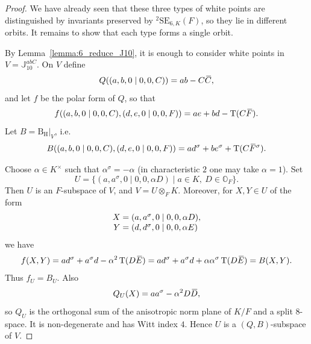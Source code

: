 \documentclass{amsart}
\def\ovC{\mathord{\mbox{\hspace*{0pt}}\,\overline{\!C\!\!\;}\!\:}\mbox{\hspace*{0pt}}}
\def\ovD{\mathord{\mbox{\hspace*{0pt}}\,\overline{\!D\!\!\;}\!\:}\mbox{\hspace*{0pt}}}
\def\ovE{\mathord{\mbox{\hspace*{0pt}}\,\overline{\!E\!\!\;}\!\:}\mbox{\hspace*{0pt}}}
\def\ovF{\mathord{\mbox{\hspace*{0pt}}\,\overline{\!F\!\!\;}\!\:}\mbox{\hspace*{0pt}}}
\def\OO{\mathord{\mathbb{O}}}
\newcommand{\SE}{\mathrm{SE}}
\newcommand{\Tr}{\operatorname{T}}
\newcommand{\J}{\mathbb{J}}
\newcommand{\B}{\mathrm{B}}
\renewcommand{\H}{\mathrm{H}}
\newcommand{\s}{\sigma}
\theoremstyle{plain}
\numberwithin{theorem}{section}
\theoremstyle{definition}
\begin{document}
\begin{proof}
	We have already seen that these three types of white points are distinguished by 
	invariants preserved by ${}^2\SE_{6,K}(F)$, so they lie in different orbits. It remains 
	to show that each type forms a single orbit.

	By Lemma~\ref{lemma:6_reduce_J10}, it is enough to consider white points
	in $V=\J_{10}^{abC}$. On $V$ define
	\[
		Q((a,b,0\mid 0,0,C))=ab-C\ovC,
	\]
	and let $f$ be the polar form of $Q$, so that
	\[
		f((a,b,0\mid 0,0,C),(d,e,0\mid 0,0,F))=ae+bd-\Tr(C\ovF).
	\]
	Let $B=\B_{\H}|_{V}$, i.e.
	\[
		B((a,b,0\mid 0,0,C),(d,e,0\mid 0,0,F))=ad^{\s}+be^{\s}+\Tr(C\ovF^{\s}).
	\]

	Choose $\alpha\in K^{\times}$ such that $\alpha^{\s}=-\alpha$ (in characteristic $2$ one may take $\alpha=1$). Set
	\[
		U=\{(a,a^{\s},0\mid 0,0,\alpha D)\mid a\in K,\ D\in\OO_F\}.
	\]
	Then $U$ is an $F$-subspace of $V$, and $V=U\otimes_F K$.
	Moreover, for $X,Y\in U$ of the form
	\begin{equation*}
		\begin{array}{r@{\;}c@{\;}l}
			X&=&(a,a^{\s},0\mid 0,0,\alpha D),\\
			Y&=&(d,d^{\s},0\mid 0,0,\alpha E)
		\end{array}
	\end{equation*}
	we have
	\[
		f(X,Y)=ad^{\s}+a^{\s}d-\alpha^{2}\Tr(D\ovE)
		 =ad^{\s}+a^{\s}d+\alpha\alpha^{\s}\Tr(D\ovE)
		=B(X,Y).
	\]
	Thus $f_U=B_U$. Also
	\[
		Q_U(X)=aa^{\s}-\alpha^{2}D\ovD,
	\]
	so $Q_U$ is the orthogonal sum of the anisotropic norm plane of $K/F$
	and a split $8$-space. It is non-degenerate and has Witt index $4$.
	Hence $U$ is a $(Q,B)$-subspace of $V$.


\end{proof}
\end{document}
